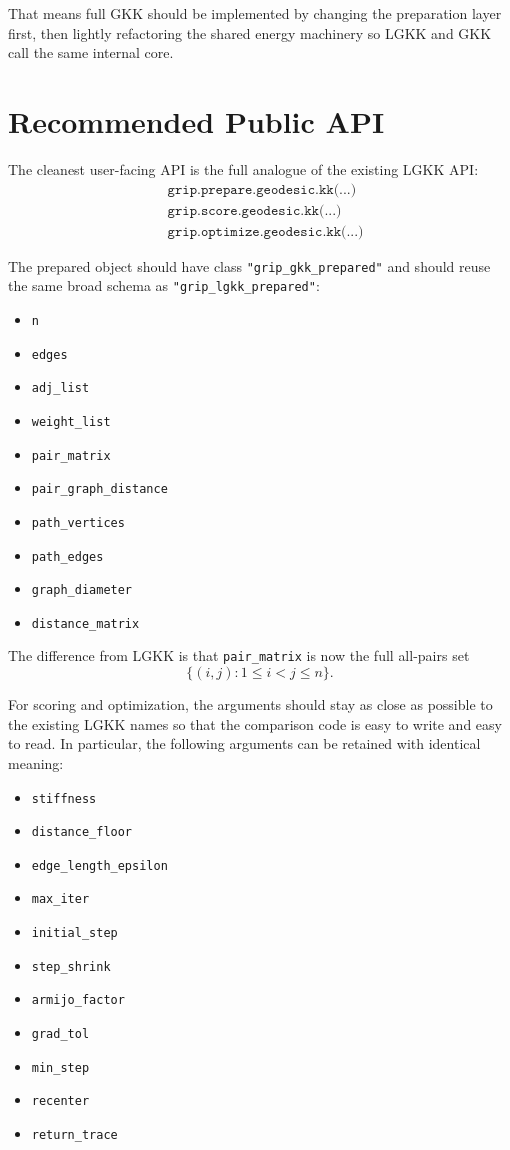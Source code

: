 \documentclass[11pt]{article}
\begin{document}
That means full GKK should be implemented by changing the preparation layer
first, then lightly refactoring the shared energy machinery so LGKK and GKK
call the same internal core.

\section{Recommended Public API}

The cleanest user-facing API is the full analogue of the existing LGKK API:
\begin{align*}
&\texttt{grip.prepare.geodesic.kk(...)} \\
&\texttt{grip.score.geodesic.kk(...)} \\
&\texttt{grip.optimize.geodesic.kk(...)}
\end{align*}

The prepared object should have class \texttt{"grip\_gkk\_prepared"} and should
reuse the same broad schema as \texttt{"grip\_lgkk\_prepared"}:
\begin{itemize}[leftmargin=1.5em]
\item \texttt{n}
\item \texttt{edges}
\item \texttt{adj\_list}
\item \texttt{weight\_list}
\item \texttt{pair\_matrix}
\item \texttt{pair\_graph\_distance}
\item \texttt{path\_vertices}
\item \texttt{path\_edges}
\item \texttt{graph\_diameter}
\item \texttt{distance\_matrix}
\end{itemize}

The difference from LGKK is that \texttt{pair\_matrix} is now the full all-pairs
set
\[
\{(i,j) : 1 \le i < j \le n\}.
\]

For scoring and optimization, the arguments should stay as close as possible to
the existing LGKK names so that the comparison code is easy to write and easy to
read. In particular, the following arguments can be retained with identical
meaning:
\begin{itemize}[leftmargin=1.5em]
\item \texttt{stiffness}
\item \texttt{distance\_floor}
\item \texttt{edge\_length\_epsilon}
\item \texttt{max\_iter}
\item \texttt{initial\_step}
\item \texttt{step\_shrink}
\item \texttt{armijo\_factor}
\item \texttt{grad\_tol}
\item \texttt{min\_step}
\item \texttt{recenter}
\item \texttt{return\_trace}
\end{itemize}
\end{document}
